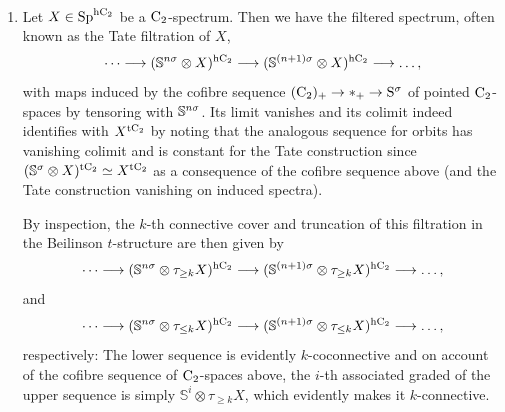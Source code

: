 \begin{example}\
\begin{enumerate}
\item Let $X \in \mathrm{Sp}^{\mathrm{h}\mathrm{C_2}}$ be a $\mathrm{C_2}$-spectrum. Then we have the filtered spectrum, often known as the Tate filtration of $X$, 
\[
\dots \longrightarrow (\mathbb{S}^{n\sigma} \otimes X)^{\mathrm{h}\mathrm{C_2}} \longrightarrow (\mathbb{S}^{(n+1)\sigma} \otimes X)^{\mathrm{h}\mathrm{C_2}} \longrightarrow \dots,
\]
with maps induced by the cofibre sequence $(\mathrm{C_2})_+ \rightarrow \ast_+ \rightarrow \mathrm S^\sigma$ of pointed $\mathrm{C_2}$-spaces by tensoring with $\mathbb{S}^{n\sigma}$. Its limit vanishes and its colimit indeed identifies with $X^{\mathrm{t}\mathrm{C_2}}$ by noting that the analogous sequence for orbits has vanishing colimit and is constant for the Tate construction since $(\mathbb{S}^\sigma \otimes X)^{\mathrm{t}\mathrm{C_2}} \simeq X^{\mathrm{t}\mathrm{C_2}}$ as a consequence of the cofibre sequence above (and the Tate construction vanishing on induced spectra).

By inspection, the $k$-th connective cover and truncation of this filtration in the Beilinson $t$-structure are then given by 
\[
\dots \longrightarrow (\mathbb{S}^{n\sigma} \otimes \tau_{\geq k} X)^{\mathrm{h}\mathrm{C_2}} \longrightarrow (\mathbb{S}^{(n+1)\sigma} \otimes \tau_{\geq k} X)^{\mathrm{h}\mathrm{C_2}} \longrightarrow \dots,
\]
and
\[
\dots \longrightarrow (\mathbb{S}^{n\sigma} \otimes \tau_{\leq k} X)^{\mathrm{h}\mathrm{C_2}} \longrightarrow (\mathbb{S}^{(n+1)\sigma} \otimes \tau_{\leq k} X)^{\mathrm{h}\mathrm{C_2}} \longrightarrow \dots,
\]
respectively: The lower sequence is evidently $k$-coconnective and on account of the cofibre sequence of $\mathrm{C_2}$-spaces above, the $i$-th associated graded of the upper sequence is simply $\mathbb S^i \otimes \tau_{\geq k} X$, which evidently makes it $k$-connective. 


\end{enumerate}
\end{example}
